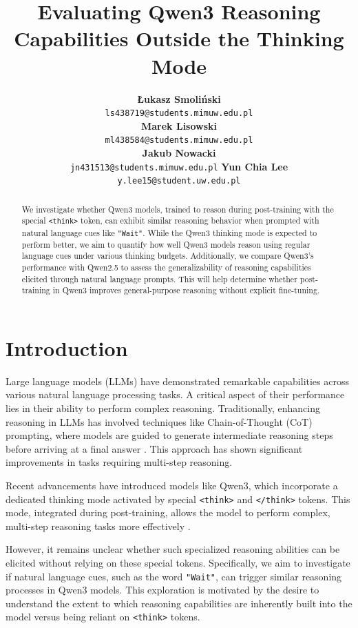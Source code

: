 \documentclass[11pt]{article}
\title{Evaluating Qwen3 Reasoning Capabilities Outside the Thinking Mode}
\author{
  \textbf{Łukasz Smoliński}\\
  \texttt{ls438719@students.mimuw.edu.pl}\\
  \And
  \textbf{Marek Lisowski}\\
  \texttt{ml438584@students.mimuw.edu.pl}\\
  \AND
  \textbf{Jakub Nowacki}\\
  \texttt{jn431513@students.mimuw.edu.pl}
  \And
  \textbf{Yun Chia Lee}\\
  \texttt{y.lee15@student.uw.edu.pl}
}
\date{\vspace*{-0.2cm}}
\begin{document}
\maketitle

\begin{abstract}
We investigate whether Qwen3 models, trained to reason during post-training
with the special \texttt{<think>} token, can exhibit similar reasoning
behavior when prompted with natural language cues like \texttt{"Wait"}.
While the Qwen3 thinking mode is expected to perform better, we aim to
quantify how well Qwen3 models reason using regular language cues under
various thinking budgets. Additionally, we compare Qwen3's performance with
Qwen2.5 to assess the generalizability of reasoning capabilities elicited
through natural language prompts. This will help determine whether
post-training in Qwen3 improves general-purpose reasoning without
explicit fine-tuning.
\end{abstract}

\section{Introduction}
Large language models (LLMs) have demonstrated remarkable capabilities across
various natural language processing tasks. A critical aspect of their
performance lies in their ability to perform complex reasoning. Traditionally,
enhancing reasoning in LLMs has involved techniques like Chain-of-Thought
(CoT) prompting, where models are guided to generate intermediate reasoning
steps before arriving at a final answer \citep{cot}. This approach
has shown significant improvements in tasks requiring multi-step reasoning.

Recent advancements have introduced models like Qwen3, which incorporate a
dedicated thinking mode activated by special \texttt{<think>} and
\texttt{</think>} tokens. This mode, integrated during post-training, allows the
model to perform complex, multi-step reasoning tasks more effectively
\citep{qwen3}.

However, it remains unclear whether such specialized reasoning abilities can
be elicited without relying on these special tokens. Specifically, we aim to
investigate if natural language cues, such as the word \texttt{"Wait"}, can
trigger similar reasoning processes in Qwen3 models. This exploration is
motivated by the desire to understand the extent to which reasoning
capabilities are inherently built into the model versus being reliant on
\texttt{<think>} tokens.
\end{document}
